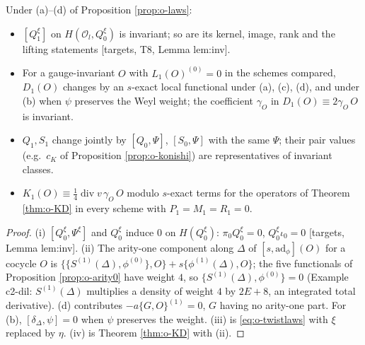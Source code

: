 \begin{theorem}
\label{thm:o-invariants}
Under (a)--(d) of Proposition \ref{prop:o-laws}:
\begin{itemize}
\item[(i)] $[Q_1^\xi]$ on $H(\mathscr O_l,Q_0^\xi)$ is invariant; so are its kernel, image, rank and the lifting statements [targets, T8, Lemma lem:inv].
\item[(ii)] For a gauge-invariant $O$ with $L_1(O)^{(0)}=0$ in the schemes compared, $D_1(O)$ changes by an $s$-exact local functional under (a), (c), (d), and under (b) when $\psi$ preserves the Weyl weight; the coefficient $\gamma_O$ in $D_1(O)\equiv2\gamma_O\,O$ is invariant.
\item[(iii)] $Q_1,S_1$ change jointly by $[Q_0,\Psi]$, $[S_0,\Psi]$ with the same $\Psi$; their pair values (e.g.\ $c_K$ of Proposition \ref{prop:o-konishi}) are representatives of invariant classes.
\item[(iv)] $K_1(O)\equiv\tfrac14\operatorname{div}v\,\gamma_O\,O$ modulo $s$-exact terms for the operators of Theorem \ref{thm:o-KD} in every scheme with $P_1=M_1=R_1=0$.
\end{itemize}
\end{theorem}

\begin{proof}
(i) $[Q_0^\xi,\Psi^\xi]$ and $Q_0^\xi$ induce $0$ on $H(Q_0^\xi)$: $\pi_0Q_0^\xi=0$, $Q_0^\xi\iota_0=0$ [targets, Lemma lem:inv]. (ii) The arity-one component along $\Delta$ of $[s,\mathrm{ad}_\phi](O)$ for a cocycle $O$ is $\{\{S^{(1)}(\Delta),\phi^{(0)}\},O\}+s\{\phi^{(1)}(\Delta),O\}$; the five functionals of Proposition \ref{prop:o-arity0} have weight $4$, so $\{S^{(1)}(\Delta),\phi^{(0)}\}=0$ (Example c2-dil: $S^{(1)}(\Delta)$ multiplies a density of weight $4$ by $2E+8$, an integrated total derivative). (d) contributes $-a\{G,O\}^{(1)}=0$, $G$ having no arity-one part. For (b), $[\delta_\Delta,\psi]=0$ when $\psi$ preserves the weight. (iii) is \eqref{eq:o-twistlaws} with $\xi$ replaced by $\eta$. (iv) is Theorem \ref{thm:o-KD} with (ii).
\end{proof}

